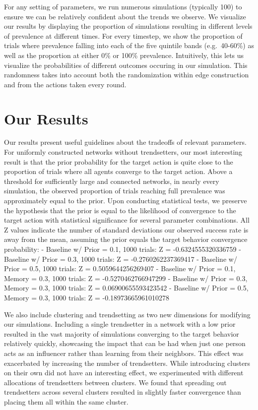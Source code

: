 \documentclass[11pt]{article}
\begin{document}
For any setting of parameters, we run numerous simulations (typically
100) to ensure we can be relatively confident about the trends we
observe. We visualize our results by displaying the proportion of
simulations resulting in different levels of prevalence at different
times. For every timestep, we show the proportion of trials where
prevalence falling into each of the five quintile bands (e.g.~40-60\%)
as well as the proportion at either 0\% or 100\% prevalence.
Intuitively, this lets us visualize the probabilities of different
outcomes occuring in our simulation. This randomness takes into account
both the randomization within edge construction and from the actions
taken every round.

\hypertarget{our-results}{%
\section{Our Results}\label{our-results}}

Our results present useful guidelines about the tradeoffs of relevant
parameters. For uniformly constructed networks without trendsetters, our
most interesting result is that the prior probability for the target
action is quite close to the proportion of trials where all agents
converge to the target action. Above a threshold for sufficiently large
and connected networks, in nearly every simulation, the observed
proportion of trials reaching full prevalence was approximately equal to
the prior. Upon conducting statistical tests, we preserve the hypothesis
that the prior is equal to the likelihood of convergence to the target
action with statistical significance for several parameter combinations.
All Z values indicate the number of standard deviations our observed
success rate is away from the mean, assuming the prior equals the target
behavior convergence probability: - Baseline w/ Prior = 0.1, 1000
trials: Z = -0.6324555320336759 - Baseline w/ Prior = 0.3, 1000 trials:
Z = -0.2760262237369417 - Baseline w/ Prior = 0.5, 1000 trials: Z =
0.5059644256269407 - Baseline w/ Prior = 0.1, Memory = 0.3, 1000 trials:
Z = -0.5270462766947299 - Baseline w/ Prior = 0.3, Memory = 0.3, 1000
trials: Z = 0.06900655593423542 - Baseline w/ Prior = 0.5, Memory = 0.3,
1000 trials: Z = -0.18973665961010278

We also include clustering and trendsetting as two new dimensions for
modifying our simulations. Including a single trendsetter in a network
with a low prior resulted in the vast majority of simulations converging
to the target behavior relatively quickly, showcasing the impact that
can be had when just one person acts as an influencer rather than
learning from their neighbors. This effect was exacerbated by increasing
the number of trendsetters. While introducing clusters on their own did
not have an interesting effect, we experimented with different
allocations of trendsetters between clusters. We found that spreading
out trendsetters across several clusters resulted in slightly faster
convergence than placing them all within the same cluster.
\end{document}
